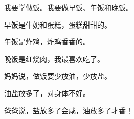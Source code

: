 \documentclass[12pt,UTF-8,openany]{ctexbook}
\begin{document}
\begin{large}
    
    我要学做饭。我要做早饭、午饭和晚饭。
    
    早饭是牛奶和蛋糕，蛋糕甜甜的。
    
    午饭是炸鸡，炸鸡香香的。
    
    晚饭是红烧肉，我最喜欢吃了。
    
    妈妈说，做饭要少放油，少放盐。

    油盐放多了，对身体不好。

    爸爸说，盐放多了会咸，油放多了才香！
    
\end{large}


\clearpage

\begin{center}
    
\end{center}


\hanzibox{}\hanzibox{}\hanzibox{}\hanzibox{}\hspace{1em}\hanzibox{}\hanzibox{}\hanzibox{}\hanzibox{}

\hanzibox{}\hanzibox{}\hanzibox{}\hanzibox{}\hspace{1em}\hanzibox{}\hanzibox{}\hanzibox{}\hanzibox{}

\hanzibox{}\hanzibox{}\hanzibox{}\hanzibox{}\hspace{1em}\hanzibox{}\hanzibox{}\hanzibox{}\hanzibox{}

\hanzibox{}\hanzibox{}\hanzibox{}\hanzibox{}\hspace{1em}\hanzibox{}\hanzibox{}\hanzibox{}\hanzibox{}
\end{document}
